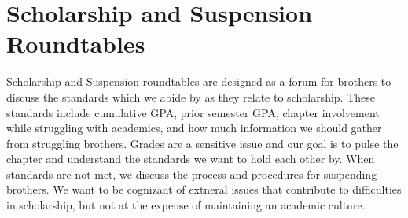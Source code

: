  \section*{Scholarship and Suspension Roundtables}
    Scholarship and Suspension roundtables are designed as a forum for brothers to discuss the standards which we abide by as they relate to scholarship. These standards include cumulative GPA, prior semester GPA, chapter involvement while struggling with academics, and how much information we should gather from struggling brothers. Grades are a sensitive issue and our goal is to pulse the chapter  and understand the standards we want to hold each other by. When standards are not met, we discuss the process and procedures for suspending brothers. We want to be cognizant of extneral issues that contribute to difficulties in scholarship, but not at the expense of maintaining an academic culture.